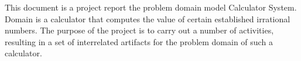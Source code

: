 This document is a project report the problem domain model Calculator System. Domain is a calculator that computes the value of certain established irrational numbers. The purpose of the project is to carry out a number of activities, resulting in a set of interrelated artifacts for the problem domain of such a calculator.